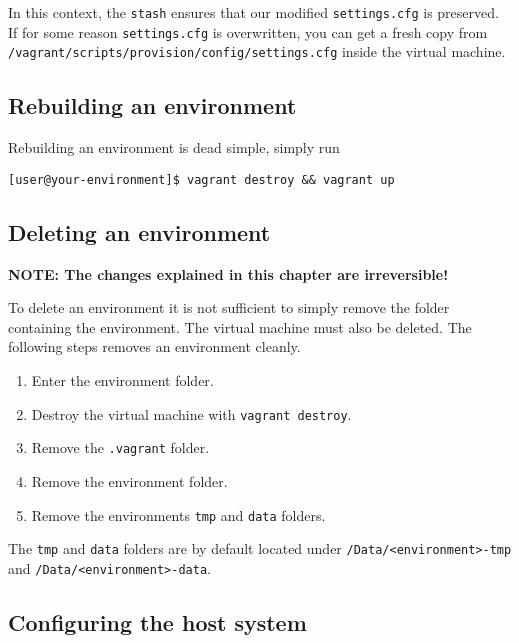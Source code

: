 In this context, the \texttt{stash} ensures that our modified
\texttt{settings.cfg} is preserved. If for some reason
\texttt{settings.cfg} is overwritten, you can get a fresh copy from
\texttt{/vagrant/scripts/provision/config/settings.cfg} inside the
virtual machine.

\subsection{Rebuilding an environment}\label{rebuilding-an-environment}

Rebuilding an environment is dead simple, simply run

\begin{verbatim}
[user@your-environment]$ vagrant destroy && vagrant up
\end{verbatim}

\subsection{Deleting an environment}\label{deleting-an-environment}

\textbf{NOTE: The changes explained in this chapter are irreversible!}

To delete an environment it is not sufficient to simply remove the
folder containing the environment. The virtual machine must also be
deleted. The following steps removes an environment cleanly.

\begin{enumerate}
\itemsep1pt\parskip0pt
\item
  Enter the environment folder.
\item
  Destroy the virtual machine with \texttt{vagrant\ destroy}.
\item
  Remove the \texttt{.vagrant} folder.
\item
  Remove the environment folder.
\item
  Remove the environments \texttt{tmp} and \texttt{data} folders.
\end{enumerate}

The \texttt{tmp} and \texttt{data} folders are by default located under
\texttt{/Data/\textless{}environment\textgreater{}-tmp} and
\texttt{/Data/\textless{}environment\textgreater{}-data}.

\subsection{Configuring the host
system}\label{configuring-the-host-system}


